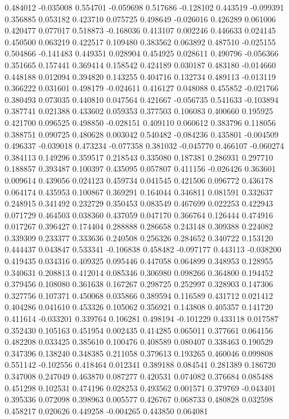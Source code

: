 0.484012
-0.035008
0.554701
-0.059698
0.517686
-0.128102
0.443519
-0.099391
0.356885
0.053182
0.423710
0.075725
0.498649
-0.026016
0.426289
0.061006
0.420477
0.077017
0.518873
-0.168036
0.413107
0.002246
0.446633
0.024145
0.450500
0.063219
0.422517
0.109480
0.383562
0.063892
0.487510
-0.025155
0.504866
-0.141483
0.449351
0.028904
0.454925
0.028611
0.490796
-0.056366
0.351665
0.157441
0.369414
0.158542
0.424189
0.030187
0.483180
-0.014660
0.448188
0.012094
0.394820
0.143255
0.404716
0.132734
0.489113
-0.013119
0.366222
0.031601
0.498179
-0.024611
0.416127
0.048088
0.455852
-0.021766
0.380493
0.073035
0.440810
0.047564
0.421667
-0.056735
0.541633
-0.103894
0.387741
0.021388
0.433602
0.059353
0.377503
0.106083
0.400660
0.195925
0.421700
0.096525
0.498850
-0.028151
0.409110
0.060612
0.383796
0.118056
0.388751
0.090725
0.480628
0.003042
0.540482
-0.084236
0.435801
-0.004509
0.496337
-0.039018
0.473234
-0.077358
0.381032
-0.045770
0.466107
-0.060274
0.384113
0.149296
0.359517
0.218543
0.335080
0.187381
0.286931
0.297710
0.188857
0.393487
0.100397
0.435095
0.057807
0.411156
-0.026426
0.363601
0.009614
0.439056
0.024123
0.459734
0.041545
0.421506
0.096772
0.436178
0.064174
0.435953
0.100867
0.369291
0.164044
0.346811
0.081591
0.332637
0.248915
0.341492
0.232729
0.350453
0.083549
0.467699
0.022253
0.422943
0.071729
0.464503
0.038360
0.437059
0.047170
0.366764
0.126444
0.474916
0.017267
0.396427
0.174404
0.288888
0.286658
0.243148
0.309388
0.224082
0.339309
0.233377
0.333636
0.240508
0.256326
0.284652
0.340722
0.153120
0.444437
0.043847
0.533341
-0.106838
0.458482
-0.097177
0.443113
-0.038200
0.419435
0.034316
0.409325
0.095446
0.447058
0.064899
0.348953
0.128955
0.340631
0.208813
0.412014
0.085346
0.306980
0.098266
0.364800
0.194452
0.379456
0.108080
0.361638
0.167267
0.298725
0.252997
0.328903
0.147306
0.327756
0.107371
0.450068
0.035866
0.389594
0.116589
0.431712
0.021412
0.404286
0.041610
0.453326
0.105062
0.356921
0.143808
0.405357
0.141720
0.411614
-0.033201
0.339764
0.106281
0.498194
-0.101229
0.433118
0.017587
0.352430
0.105163
0.451954
0.002435
0.414285
0.065011
0.377661
0.064156
0.482208
0.033425
0.385610
0.100476
0.408589
0.080407
0.338463
0.190529
0.347396
0.138240
0.348385
0.211058
0.379613
0.193265
0.460046
0.099808
0.551142
-0.102556
0.418464
0.012341
0.389188
0.084541
0.281389
0.186720
0.347008
0.247049
0.463870
0.087277
0.420531
0.074082
0.376684
0.085488
0.451298
0.102531
0.474196
0.028253
0.493562
0.001571
0.379769
-0.043401
0.395336
0.072098
0.398963
0.005577
0.426767
0.068733
0.480828
0.032598
0.458217
0.020626
0.449258
-0.004265
0.443850
0.064081

